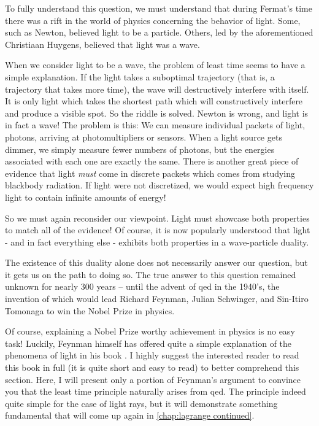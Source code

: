 To fully understand this question, we must understand that during Fermat's time there was a rift in the world of physics concerning the behavior of light. Some, such as Newton, believed light to be a particle. Others, led by the aforementioned Christiaan Huygens, believed that light was a wave.

When we consider light to be a wave, the problem of least time seems to have a simple explanation. If the light takes a suboptimal trajectory (that is, a trajectory that takes more time), the wave will destructively interfere with itself. It is only light which takes the shortest path which will constructively interfere and produce a visible spot. So the riddle is solved. Newton is wrong, and light is in fact a wave! The problem is this: We can measure individual packets of light, photons, arriving at photomultipliers or sensors. When a light source gets dimmer, we simply measure fewer numbers of photons, but the energies associated with each one are exactly the same. There is another great piece of evidence that light \textit{must} come in discrete packets which comes from studying blackbody radiation. If light were not discretized, we would expect high frequency light to contain infinite amounts of energy!

So we must again reconsider our viewpoint. Light must showcase both properties to match all of the evidence! Of course, it is now popularly understood that light - and in fact everything else - exhibits both properties in a wave-particle duality.

The existence of this duality alone does not necessarily answer our question, but it gets us on the path to doing so. The true answer to this question remained unknown for nearly 300 years -- until the advent of \gls{qed} in the 1940's, the invention of which would lead Richard Feynman, Julian Schwinger, and Sin-Itiro Tomonaga to win the Nobel Prize in physics.

Of course, explaining a Nobel Prize worthy achievement in physics is no easy task! Luckily, Feynman himself has offered quite a simple explanation of the phenomena of light in his book \cite{richard_phillips_feynman_qed_1988}. I highly suggest the interested reader to read this book in full (it is quite short and easy to read) to better comprehend this section. Here, I will present only a portion of Feynman's argument to convince you that the least time principle naturally arises from \gls{qed}. The principle indeed quite simple for the case of light rays, but it will demonstrate something fundamental that will come up again in \autoref{chap:lagrange continued}.

